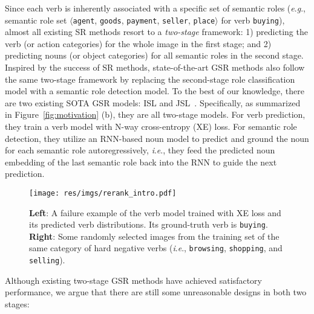 \documentclass[letterpaper]{article} \usepackage{aaai22}  \usepackage{times}  \usepackage{helvet}  \usepackage{courier}  \usepackage[hyphens]{url}  \usepackage{graphicx} \urlstyle{rm} \def\UrlFont{\rm}  \usepackage{natbib}  \usepackage{caption} \DeclareCaptionStyle{ruled}{labelfont=normalfont,labelsep=colon,strut=off} \frenchspacing  \setlength{\pdfpagewidth}{8.5in}  \setlength{\pdfpageheight}{11in}
\newcommand{\ie}{\textit{i}.\textit{e}.}
\newcommand{\eg}{\textit{e}.\textit{g}.}
\begin{document}
Since each verb is inherently associated with a specific set of semantic roles (\eg, semantic role set $\langle$\texttt{agent}, \texttt{goods}, \texttt{payment}, \texttt{seller}, \texttt{place}$\rangle$ for verb \texttt{buying}), almost all existing SR methods resort to a \emph{two-stage} framework: 1) predicting the verb (or action categories) for the whole image in the first stage; and 2) predicting nouns (or object categories) for all semantic roles in the second stage. Inspired by the success of SR methods, state-of-the-art GSR methods also follow the same two-stage framework by replacing the second-stage role classification model with a semantic role detection model. To the best of our knowledge, there are two existing SOTA GSR models: ISL and JSL~\cite{pratt2020grounded}. Specifically, as summarized in Figure~\ref{fig:motivation} (b), they are all two-stage models. For verb prediction, they train a verb model with N-way cross-entropy (XE) loss. For semantic role detection, they utilize an RNN-based noun model to predict and ground the noun for each semantic role autoregressively, \ie, they feed the predicted noun embedding of the last semantic role back into the RNN to guide the next prediction.


















\begin{figure}[t]
    \centering
    \texttt{[image: res/imgs/rerank\_intro.pdf]}
    \caption{\textbf{Left}: A failure example of the verb model trained with XE loss and its predicted verb distributions. Its ground-truth verb is \texttt{buying}. \textbf{Right}: Some randomly selected images from the training set of the same category of hard negative verbs (\ie, \texttt{browsing}, \texttt{shopping}, and \texttt{selling}).}
    \label{fig:rerank_intro}
\end{figure}


Although existing two-stage GSR methods have achieved satisfactory performance, we argue that there are still some unreasonable designs in both two stages:
\end{document}
